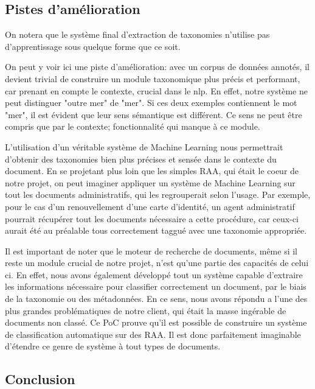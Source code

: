
\subsection {Pistes d'amélioration}
On notera que le système final d'extraction de taxonomies n'utilise pas d'apprentissage sous quelque forme que ce soit.

On peut y voir ici une piste d'amélioration: avec un corpus de données annotés, il devient trivial de construire un module taxonomique plus précis et performant, car prenant en compte le contexte, crucial dans le \gls{nlp}.
En effet, notre système ne peut distinguer "outre mer" de "mer". Si ces deux exemples contiennent le mot "mer", il est évident que leur sens sémantique est différent. Ce sens ne peut être compris que par le contexte; fonctionnalité qui manque à ce module. 

L'utilisation d'un véritable système de Machine Learning nous permettrait d'obtenir des taxonomies bien plus précises et sensée dans le contexte du document. En se projetant plus loin que les simples RAA, qui était le coeur de notre projet, on peut imaginer appliquer un système de Machine Learning sur tout les documents administratifs, qui les regrouperait selon l'usage. Par exemple, pour le cas d'un renouvellement d'une carte d'identité, un agent administratif pourrait récupérer tout les documents nécessaire a cette procédure, car ceux-ci aurait été au préalable tous correctement taggué avec une taxonomie appropriée. 

Il est important de noter que le moteur de recherche de documents, même si il reste un module crucial de notre projet, n'est qu'une partie des capacités de celui ci. En effet, nous avons également développé tout un système capable d'extraire les informations nécessaire pour classifier correctement un document, par le biais de la taxonomie ou des métadonnées. En ce sens, nous avons répondu a l'une des plus grandes problématiques de notre client, qui était la masse ingérable de documents non classé. Ce PoC prouve qu'il est possible de construire un système de classification automatique sur des RAA. Il est donc parfaitement imaginable d'étendre ce genre de système à tout types de documents. 

\subsection {Conclusion}




